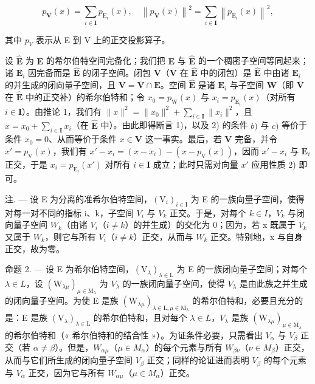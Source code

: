 \[
p _ {\mathbf {V}} (x) = \sum_ {i \in \mathbf {I}} p _ {\mathrm{E} _ {i}} (x), \quad \left\| p _ {\mathbf {V}} (x) \right\| ^ {2} = \sum_ {i \in \mathbf {I}} \left\| p _ {\mathrm{E} _ {i}} (x) \right\| ^ {2},
\]

其中 \(p_{V}\) 表示从 E 到 V 上的正交投影算子。

设 \(\hat{\mathbf{E}}\) 为 \(\mathbf{E}\) 的希尔伯特空间完备化；我们把 \(\mathbf{E}\) 与 \(\hat{\mathbf{E}}\) 的一个稠密子空间等同起来；诸 \(\mathbf{E}_i\) 因完备而是 \(\hat{\mathbf{E}}\) 的闭子空间。闭包 \(\overline{\mathbf{V}}\)（\(\mathbf{V}\) 在 \(\hat{\mathbf{E}}\) 中的闭包）是 \(\hat{\mathbf{E}}\) 中由诸 \(\mathbf{E}_i\) 的并生成的闭向量子空间，且 \(\mathbf{V} = \overline{\mathbf{V}} \cap \mathbf{E}\)。空间 \(\hat{\mathbf{E}}\) 是诸 \(\mathbf{E}_i\) 与子空间 \(\mathbf{W}\)（即 \(\overline{\mathbf{V}}\) 在 \(\hat{\mathbf{E}}\) 中的正交补）的希尔伯特和；令 \(x_0 = p_{\mathrm{W}}(x)\) 与 \(x_i = p_{\mathrm{E}_i}(x)\)（对所有 \(i \in \mathbf{I}\)）。由推论 1，我们有 \(\| x\|^2 = \| x_0\|^2 + \sum_{i \in \mathbf{I}} \| x_i\|^2\)，且 \(x = x_0 + \sum_{i \in \mathbf{I}} x_i\)（在 \(\hat{\mathbf{E}}\) 中）。由此即得断言 1)，以及 2) 的条件 \(b)\) 与 \(c)\) 等价于条件 \(x_0 = 0\)、从而等价于条件 \(x \in \mathbf{V}\) 这一事实。最后，若 \(\mathbf{V}\) 完备，并令 \(x' = p_{\mathrm{V}}(x)\)，我们有 \(x' - x_i = (x - x_i) - (x - p_{\mathrm{V}}(x))\)，因而 \(x' - x_i\) 与 \(\mathbf{E}_i\) 正交，于是 \(x_i = p_{\mathrm{E}_i}(x')\) 对所有 \(i \in \mathbf{I}\) 成立；此时只需对向量 \(x'\) 应用性质 2) 即可。

注. --- 设 E 为分离的准希尔伯特空间，\((\mathrm{V}_{i})_{i\in\mathrm{I}}\) 为 E 的一族向量子空间，使得对每一对不同的指标 i、k，子空间 \(V_{i}\) 与 \(V_{k}\) 正交。于是，对每个 \(k\in I\)，\(V_{k}\) 与闭向量子空间 \(W_{k}\)（由诸 \(V_{i}\)（\(i\neq k\)）的并生成）的交化为 0；因为，若 x 既属于 \(V_{k}\) 又属于 \(W_{k}\)，则它与所有 \(V_{i}\)（\(i\neq k\)）正交，从而与 \(W_{k}\) 正交。特别地，x 与自身正交，故为零。

命题 2. --- 设 E 为希尔伯特空间，\((\mathrm{V}_{\lambda})_{\lambda\in\mathrm{L}}\) 为 E 的一族闭向量子空间；对每个 \(\lambda\in L\)，设 \((\mathrm{W}_{\lambda\mu})_{\mu\in\mathrm{M}_{\lambda}}\) 为 \(V_{\lambda}\) 的一族闭向量子空间，使得 \(V_{\lambda}\) 是由此族之并生成的闭向量子空间。为使 E 是族 \((\mathrm{W}_{\lambda\mu})_{\lambda\in\mathrm{L},\mu\in\mathrm{M}_{\lambda}}\) 的希尔伯特和，必要且充分的是：E 是族 \((\mathrm{V}_{\lambda})_{\lambda\in\mathrm{L}}\) 的希尔伯特和，且对每个 \(\lambda\in L\)，\(V_{\lambda}\) 是族 \((\mathrm{W}_{\lambda\mu})_{\mu\in\mathrm{M}_{\lambda}}\) 的希尔伯特和（« 希尔伯特和的结合性 »）。为证条件必要，只需看出 \(V_{\alpha}\) 与 \(V_{\beta}\) 正交（若 \(\alpha\neq\beta\)）。但是，\(W_{\alpha\mu}\)（\(\mu\in M_{\alpha}\)）的每个元素与所有 \(W_{\beta\nu}\)（\(\nu\in M_{\beta}\)）正交，从而与它们所生成的闭向量子空间 \(V_{\beta}\) 正交；同样的论证进而表明 \(V_{\beta}\) 的每个元素与 \(V_{\alpha}\) 正交，因为它与所有 \(W_{\alpha\mu}\)（\(\mu\in M_{\alpha}\)）正交。

